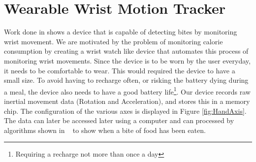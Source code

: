 \section{Wearable Wrist Motion Tracker}
\label{Sec:WearbleTracker}
Work done in \cite{drennan2010assessment} shows a device that is capable of detecting bites by monitoring wrist movement.
We are motivated by the problem of monitoring calorie consumption by creating a wrist watch like device that automates this process of monitoring wrist movements.
Since the device is to be worn by the user everyday, it needs to be comfortable to wear.
This would required the device to have a small size.
To avoid having to recharge often, or risking the battery dying during a meal,
the device also needs to have a good battery life\footnote{Requiring a recharge not more than once a day}.
Our device records raw inertial movement data (Rotation and Acceleration), and stores this in a memory chip.
The configuration of the various axes is displayed in Figure \ref{fig:HandAxis}.
The data can later be accessed later using a computer and can processed by algorithms shown in
~\cite{dong2012new} to show when a bite of food has been eaten.

